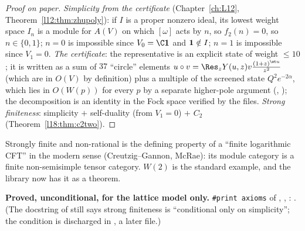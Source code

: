 \begin{proof}[Proof on paper]
\emph{Simplicity from the certificate} (Chapter~\ref{ch:L12}, Theorem~\ref{l12:thm:zhupoly}): if $I$ is a
proper nonzero ideal, its lowest weight space $I_n$ is a module for $A(V)$ on which $[\omega]$ acts by $n$,
so $f_2(n)=0$, so $n\in\{0,1\}$; $n=0$ is impossible since $V_0=\C\leighteenvac$ and $\mathbf{1}\notin I$;
$n=1$ is impossible since $V_1=0$. \emph{The certificate}: the representative is an explicit state of weight
$\le10$; it is written as a sum of $37$ ``circle'' elements $u\circ v=\Res_zY(u,z)v\frac{(1+z)^{\wt u}}{z^2}$
(which are in $O(V)$ by definition) plus a multiple of the screened state $Q^2e^{-2\alpha}$, which lies in
$O(W(p))$ for every $p$ by a separate higher-pole argument (,
); the decomposition is an identity in the Fock space verified by the
 files. \emph{Strong finiteness}: simplicity $+$ self-duality (from
$V_1=0$) $+$ $C_2$ (Theorem~\ref{l18:thm:c2two}).
\end{proof}
\begin{physics}
Strongly finite and non-rational is the defining property of a ``finite logarithmic CFT'' in the modern
sense (Creutzig--Gannon, McRae): its module category is a finite non-semisimple tensor category. $W(2)$
is the standard example, and the library now has it as a theorem.
\end{physics}
\begin{status}
\textbf{Proved, unconditional, for the lattice model only.} \texttt{\#print axioms} of ,
, :
. (The docstring of 
still says strong finiteness is ``conditional only on simplicity''; the condition is discharged in
, a later file.)
\end{status}

